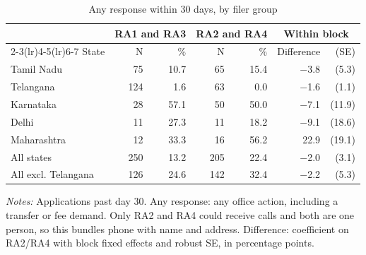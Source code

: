 \begin{table}[!htbp]
\centering
\caption{Any response within 30 days, by filer group}
\label{tab:tab_filer}
\small
\begin{threeparttable}
\begin{tabular}{lrrrrrr}
\toprule
& \multicolumn{2}{c}{RA1 and RA3} & \multicolumn{2}{c}{RA2 and RA4} & \multicolumn{2}{c}{Within block} \\ \cmidrule(lr){2-3}\cmidrule(lr){4-5}\cmidrule(lr){6-7} State & N & \% & N & \% & Difference & (SE) \\
\midrule
Tamil Nadu & 75 & 10.7 & 65 & 15.4 & $-$3.8 & (5.3) \\
Telangana & 124 & 1.6 & 63 & 0.0 & $-$1.6 & (1.1) \\
Karnataka & 28 & 57.1 & 50 & 50.0 & $-$7.1 & (11.9) \\
Delhi & 11 & 27.3 & 11 & 18.2 & $-$9.1 & (18.6) \\
Maharashtra & 12 & 33.3 & 16 & 56.2 & 22.9 & (19.1) \\
\midrule
All states & 250 & 13.2 & 205 & 22.4 & $-$2.0 & (3.1) \\
All excl. Telangana & 126 & 24.6 & 142 & 32.4 & $-$2.2 & (5.3) \\
\bottomrule
\end{tabular}
\begin{tablenotes}[flushleft]\footnotesize
\item \textit{Notes:} Applications past day 30. Any response: any office action, including a transfer or fee demand. Only RA2 and RA4 could receive calls and both are one person, so this bundles phone with name and address. Difference: coefficient on RA2/RA4 with block fixed effects and robust SE, in percentage points.
\end{tablenotes}
\end{threeparttable}
\end{table}
